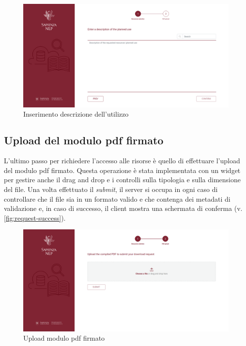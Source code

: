 \begin{figure}[H]
	\centering
	\includegraphics[width=\textwidth]{assets/ui/request-description.png}
	\caption{Inserimento descrizione dell'utilizzo}
	\label{fig:request-description}
\end{figure}


\subsection{Upload del modulo pdf firmato} \label{subsec:pdf-upload}
L'ultimo passo per richiedere l'accesso alle risorse è quello di effettuare
l'upload del modulo pdf firmato. Questa operazione è stata implementata con un
widget per gestire anche il drag and drop e i controlli sulla tipologia e sulla
dimensione del file. Una volta effettuato il \textit{submit}, il server si occupa
in ogni caso di controllare che il file sia in un formato valido e che contenga
dei metadati di validazione e, in caso di successo, il client mostra una
schermata di conferma (v. \autoref{fig:request-success}).

\begin{figure}[H]
	\centering
	\includegraphics[width=\textwidth]{assets/ui/pdf-upload.png}
	\caption{Upload modulo pdf firmato}
	\label{fig:pdf-upload}
\end{figure}

